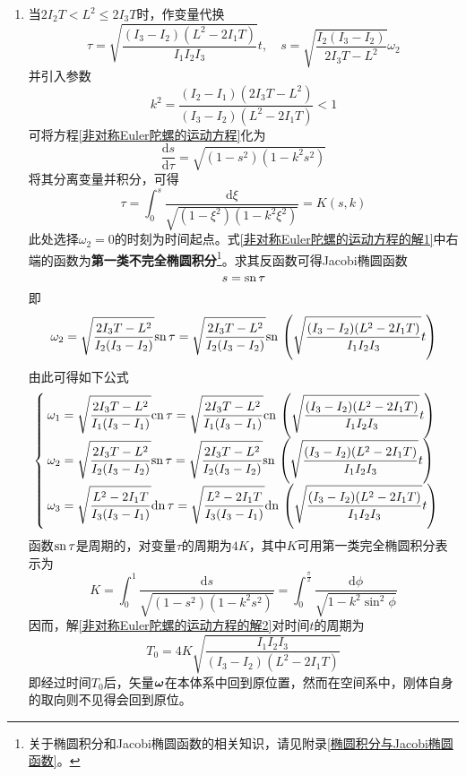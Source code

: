 \begin{enumerate}
\item 当$2I_2T<L^2\leqslant 2I_3T$时，作变量代换
\begin{equation}
	\tau = \sqrt{\frac{(I_3-I_2)(L^2-2I_1T)}{I_1I_2I_3}}t,\quad s = \sqrt{\frac{I_2(I_3-I_2)}{2I_3T-L^2}}\omega_2
\end{equation}
并引入参数
\begin{equation}
	k^2 = \frac{(I_2-I_1)(2I_3T-L^2)}{(I_3-I_2)(L^2-2I_1T)}<1
\end{equation}
可将方程\eqref{非对称Euler陀螺的运动方程}化为
\begin{equation*}
	\frac{\mathrm{d}s}{\mathrm{d}\tau} = \sqrt{(1-s^2)(1-k^2s^2)}
\end{equation*}
将其分离变量并积分，可得
\begin{equation}
	\tau = \int_0^s \frac{\mathrm{d}\xi}{\sqrt{(1-\xi^2)(1-k^2\xi^2)}} = K(s,k)
	\label{非对称Euler陀螺的运动方程的解1}
\end{equation}
此处选择$\omega_2=0$的时刻为时间起点。式\eqref{非对称Euler陀螺的运动方程的解1}中右端的函数为{\bf 第一类不完全椭圆积分}\footnote{关于椭圆积分和Jacobi椭圆函数的相关知识，请见附录\ref{椭圆积分与Jacobi椭圆函数}。}。求其反函数可得Jacobi椭圆函数
\begin{equation*}
	s = \mathrm{sn}\, \tau
\end{equation*}
即
\begin{equation}
	\omega_2 = \sqrt{\frac{2I_3T-L^2}{I_2(I_3-I_2)}}\mathrm{sn}\, \tau = \sqrt{\frac{2I_3T-L^2}{I_2(I_3-I_2)}}\mathrm{sn}\, \left(\sqrt{\frac{(I_3-I_2)(L^2-2I_1T)}{I_1I_2I_3}}t\right)
\end{equation}
由此可得如下公式
\begin{equation}
\begin{cases}
	\displaystyle \omega_1 = \sqrt{\frac{2I_3T-L^2}{I_1(I_3-I_1)}}\mathrm{cn}\, \tau = \sqrt{\frac{2I_3T-L^2}{I_1(I_3-I_1)}}\mathrm{cn}\, \left(\sqrt{\frac{(I_3-I_2)(L^2-2I_1T)}{I_1I_2I_3}}t\right) \\
	\displaystyle \omega_2 = \sqrt{\frac{2I_3T-L^2}{I_2(I_3-I_2)}}\mathrm{sn}\, \tau = \sqrt{\frac{2I_3T-L^2}{I_2(I_3-I_2)}}\mathrm{sn}\, \left(\sqrt{\frac{(I_3-I_2)(L^2-2I_1T)}{I_1I_2I_3}}t\right) \\
	\displaystyle \omega_3 = \sqrt{\frac{L^2-2I_1T}{I_3(I_3-I_1)}}\mathrm{dn}\, \tau = \sqrt{\frac{L^2-2I_1T}{I_3(I_3-I_1)}}\mathrm{dn}\, \left(\sqrt{\frac{(I_3-I_2)(L^2-2I_1T)}{I_1I_2I_3}}t\right)
\end{cases}
\label{非对称Euler陀螺的运动方程的解2}
\end{equation}
函数$\mathrm{sn}\, \tau$是周期的，对变量$\tau$的周期为$4K$，其中$K$可用第一类完全椭圆积分表示为
\begin{equation*}
	K = \int_0^1 \frac{\mathrm{d}s}{\sqrt{(1-s^2)(1-k^2s^2)}} = \int_0^{\frac{\pi}{2}} \frac{\mathrm{d}\phi}{\sqrt{1-k^2\sin^2\phi}}
\end{equation*}
因而，解\eqref{非对称Euler陀螺的运动方程的解2}对时间$t$的周期为
\begin{equation}
	T_0 = 4K\sqrt{\frac{I_1I_2I_3}{(I_3-I_2)(L^2-2I_1T)}}
\end{equation}
即经过时间$T_0$后，矢量$\boldsymbol{\omega}$在本体系中回到原位置，然而在空间系中，刚体自身的取向则不见得会回到原位。


\end{enumerate}
